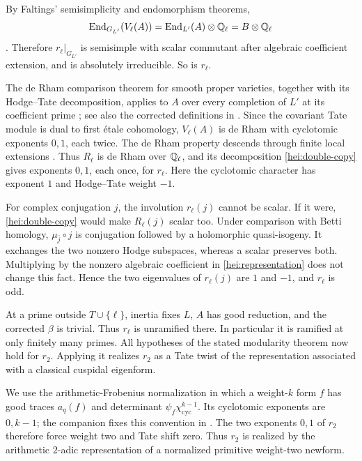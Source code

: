 By Faltings' semisimplicity and endomorphism theorems,
\[
 \operatorname{End}_{G_{L'}}(V_\ell(A))
       =\operatorname{End}_{L'}(A)\otimes\mathbb Q_\ell
       =B\otimes\mathbb Q_\ell
\]
\cite{Faltings1983}.  Therefore $r_\ell|_{G_{L'}}$ is semisimple
with scalar commutant after algebraic coefficient extension, and is
absolutely irreducible.  So is $r_\ell$.

The de Rham comparison theorem for smooth proper varieties, together
with its Hodge--Tate decomposition, applies to $A$ over every
completion of $L'$ at its coefficient prime
\cite[Corollary~1.8]{Scholze2013DeRham}; see also the corrected
definitions in \cite{Scholze2016DeRhamCorrigendum}.
Since the covariant Tate module is dual to first \'etale cohomology,
$V_\ell(A)$ is de Rham with cyclotomic exponents $0,1$, each twice.
The de Rham property descends through finite local extensions
\cite[Section~3.9(ii)]{Fontaine1994}.
Thus $R_\ell$ is de Rham over $\mathbb Q_\ell$, and its decomposition
\eqref{hei:double-copy} gives exponents $0,1$, each once, for $r_\ell$.
Here the cyclotomic character has exponent $1$ and Hodge--Tate
weight $-1$.

For complex conjugation $j$, the involution $r_\ell(j)$ cannot be
scalar.  If it were, \eqref{hei:double-copy} would make $R_\ell(j)$
scalar too.  Under comparison with Betti homology,
$\mu_{\bar j}\circ j$ is conjugation followed by a holomorphic
quasi-isogeny.  It exchanges the two nonzero Hodge subspaces, whereas
a scalar preserves both.  Multiplying by the nonzero algebraic
coefficient in \eqref{hei:representation} does not change this
fact.  Hence the two eigenvalues of $r_\ell(j)$ are $1$ and $-1$,
and $r_\ell$ is odd.

At a prime outside $T\cup\{\ell\}$, inertia fixes $L$, $A$ has
good reduction, and the corrected $\beta$ is trivial.  Thus $r_\ell$
is unramified there.  In particular it is ramified at only finitely
many primes.  All hypotheses of the stated modularity theorem now
hold for $r_2$.  Applying it realizes $r_2$ as a Tate twist of the
representation associated with a classical cuspidal eigenform.

We use the arithmetic-Frobenius normalization in which a weight-$k$
form $f$ has good traces $a_q(f)$ and determinant
$\psi_f\chi_{\mathrm{cyc}}^{k-1}$.  Its cyclotomic exponents are
$0,k-1$; the companion fixes this convention in
\cite[Section~2.1]{OddRegularFontaineMazurAtTwo}.  The two exponents
$0,1$ of $r_2$ therefore force weight two and Tate shift zero.  Thus
$r_2$ is realized by the arithmetic $2$-adic representation of a
normalized primitive weight-two newform.

